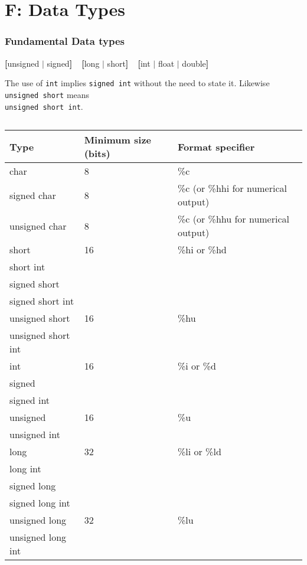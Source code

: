 \section{F: Data Types}

\begin{frame}[fragile]
\frametitle{Fundamental Data types}

{\bf [}unsigned $|$ signed{\bf ]\ \ [}long $|$ short{\bf ]\ \ [}int $|$ float $|$ double{\bf ]}


The use of {\tt int} implies {\tt signed int} without the need
to state it. Likewise {\tt unsigned short} means\\ {\tt unsigned short
int}.

\begin{columns}
\begin{column}{0.45\textwidth}

{\tiny
\begin{center}
\begin{tabular}{|l|l|l|} \hline
Type & Minimum size (bits) & Format specifier \\ \hline
%
char & 8 & \%c \\ \hline
%
signed char & 8 & \%c (or \%hhi for numerical output) \\ \hline
%
unsigned char & 8 & \%c (or \%hhu for numerical output) \\ \hline
%
short & 16 & \%hi or \%hd \\
short int &  &  \\
signed short &  &  \\
signed short int &  &  \\ \hline
%
unsigned short & 16 & \%hu \\
unsigned short int &  &  \\
int & 16 & \%i or \%d \\
signed &  &  \\
signed int &  &  \\ \hline
%
unsigned & 16 & \%u \\
unsigned int &  &  \\ \hline
%
long & 32 & \%li or \%ld \\
long int &  &  \\
signed long &  &  \\
signed long int &  &  \\ \hline
%
unsigned long & 32 & \%lu \\
unsigned long int &  &  \\ \hline
\end{tabular}
\end{center}
}
\end{column}


\end{columns}
\end{frame}
